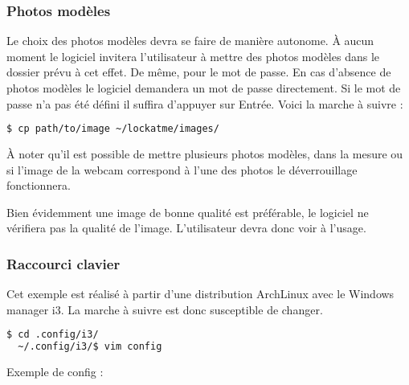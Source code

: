 \subsubsection{Photos modèles}
Le choix des photos modèles devra se faire de manière autonome. À aucun moment
le logiciel invitera l'utilisateur à mettre des photos modèles dans le dossier
prévu à cet effet. De même, pour le mot de passe. En cas d'absence de photos
modèles le logiciel demandera un mot de passe directement. Si le mot de passe
n'a pas été défini il suffira d'appuyer sur Entrée.
Voici la marche à suivre :
\begin{lstlisting}[language=bash]
  $ cp path/to/image ~/lockatme/images/
\end{lstlisting}
À noter qu'il est possible de mettre plusieurs photos modèles, dans la mesure
ou si l'image de la webcam correspond à l'une des photos le déverrouillage
fonctionnera.
\vspace{0.5cm}

Bien évidemment une image de bonne qualité est préférable, le logiciel ne
vérifiera pas la qualité de l'image. L'utilisateur devra donc voir à l'usage.
\newpage

\subsubsection{Raccourci clavier}
Cet exemple est réalisé à partir d'une distribution ArchLinux avec le Windows
manager i3. La marche à suivre est donc susceptible de changer.
\begin{lstlisting}[language=bash]
  $ cd .config/i3/
  ~/.config/i3/$ vim config
\end{lstlisting}

Exemple de config :

